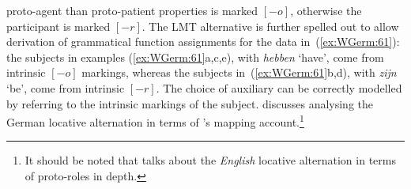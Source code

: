 \documentclass[output=paper,hidelinks]{langscibook}
\begin{document}
proto-agent than proto-patient properties is marked $[-o]$, otherwise
the participant is marked $[-r]$. The LMT alternative is further
spelled out to allow derivation of grammatical function assignments
for the data in~(\ref{ex:WGerm:61}): the subjects in examples
(\ref{ex:WGerm:61}a,c,e), with \textit{hebben} `have', come from intrinsic
$[-o]$ markings, whereas the subjects in~(\ref{ex:WGerm:61}b,d), with
\textit{zijn} `be', come from intrinsic $[-r]$. The choice of
auxiliary can be correctly modelled by referring to the intrinsic
markings of the subject. \citet{Kordoni2003} discusses analysing the German locative
alternation in terms of \citeauthor{zaenen93}'s mapping account.\footnote{It should be noted
that \citet{Dowty1991} talks about the \textit{English} locative alternation
in terms of proto-roles in depth.}
\end{document}
